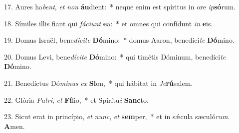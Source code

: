 17. Aures ha\textit{bent}, \textit{et} \textit{non} \textbf{áu}dient:~*  neque enim est spíritus in ore \textit{ip}\textbf{só}rum.\

18. Símiles illis fiant qui \textit{fá}\textit{ci}\textit{unt} \textbf{e}a:~*  et omnes qui confídunt \textit{in} \textbf{e}is.\

19. Domus Israël, bene\textit{dí}\textit{ci}\textit{te} \textbf{Dó}mino:~*  domus Aaron, benedíci\textit{te} \textbf{Dó}mino.\

20. Domus Levi, bene\textit{dí}\textit{ci}\textit{te} \textbf{Dó}mino:~*  qui timétis Dóminum, benedíci\textit{te} \textbf{Dó}mino.\

21. Benedíctus Dó\textit{mi}\textit{nus} \textit{ex} \textbf{Si}on,~*  qui hábitat in \textit{Je}\textbf{rú}salem.\

22. Glória \textit{Pa}\textit{tri}, \textit{et} \textbf{Fí}lio,~*  et Spirítu\textit{i} \textbf{Sanc}to.\

23. Sicut erat in princípio, \textit{et} \textit{nunc}, \textit{et} \textbf{sem}per,~*  et in sǽcula sæculó\textit{rum}. \textbf{A}men.\

